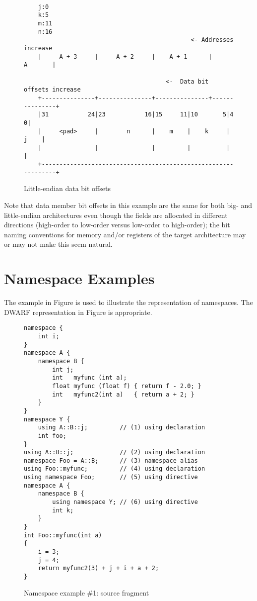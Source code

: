 \begin{figure}[h]
\begin{dwflisting}
\begin{verbatim}

    j:0
    k:5
    m:11
    n:16
                                               <- Addresses increase
    |     A + 3     |     A + 2     |    A + 1      |       A       | 

                                        <-  Data bit offsets increase 
    +---------------+---------------+---------------+---------------+
    |31           24|23           16|15     11|10       5|4        0|
    |     <pad>     |        n      |    m    |    k     |     j    |
    |               |               |         |          |          |
    +---------------------------------------------------------------+

\end{verbatim}
\end{dwflisting}
\caption{Little-endian data bit offsets}
\label{fig:littleendiandatabitoffsets}
\end{figure}

Note that data member bit offsets in this example are the
same for both big- and little-endian architectures even
though the fields are allocated in different directions
(high-order to low-order versus low-order to high-order);
the bit naming conventions for memory and/or registers of
the target architecture may or may not make this seem natural.

\clearpage
\section{Namespace Examples}
\label{app:namespaceexamples}

The  example in 
Figure 
is used 
to illustrate the representation of namespaces.
The DWARF representation in 
Figure 
is appropriate.

\begin{figure}[h]
\begin{lstlisting}
namespace {
    int i;
}
namespace A {
    namespace B {
        int j;
        int   myfunc (int a);
        float myfunc (float f) { return f - 2.0; }
        int   myfunc2(int a)   { return a + 2; }
    }
}
namespace Y {
    using A::B::j;         // (1) using declaration
    int foo;
}
using A::B::j;             // (2) using declaration
namespace Foo = A::B;      // (3) namespace alias
using Foo::myfunc;         // (4) using declaration
using namespace Foo;       // (5) using directive
namespace A {
    namespace B {
        using namespace Y; // (6) using directive
        int k;
    }
}
int Foo::myfunc(int a)
{
    i = 3;
    j = 4;
    return myfunc2(3) + j + i + a + 2;
}
\end{lstlisting}
\caption{Namespace example \#1: source fragment}
\label{fig:namespaceexample1sourcefragment}
\end{figure}


